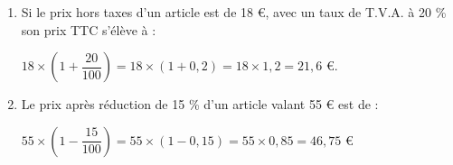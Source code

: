 \begin{myexs}
\begin{enumerate}
	\item Si le prix hors taxes d'un article est de 18 €, avec un taux de T.V.A. à 20 \% son prix TTC s'élève à  :
	
	\begin{center}
		$18 \times \left( 1+ \dfrac{20}{100} \right) = 18 \times (1 + 0,2) = 18 \times 1,2 = 21,6 $ €.
	\end{center} 
	
	
	\item Le prix après réduction de 15 \% d'un article valant 55 € est de :
		\begin{center}
			$55 \times \left( 1 - \dfrac{15}{100} \right) = 55  \times (1 - 0,15) = 55 \times 0,85 = 46, 75$ €
		\end{center}
	
\end{enumerate}
\end{myexs}
